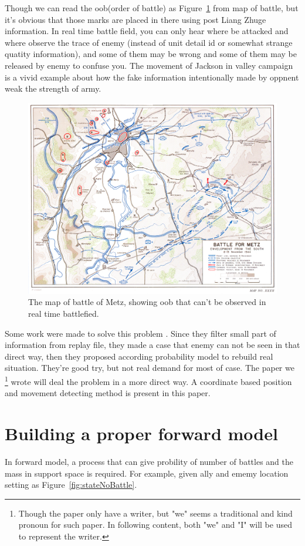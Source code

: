\documentclass{article}
\begin{document}
Though we can read the oob(order of battle) as Figure~\ref{fig:metz} from map of battle, but it's obvious that those marks are 
placed in there using post Liang Zhuge information. In real time battle field, you can only hear where
be attacked and where observe the trace of enemy (instead of unit detail id or somewhat strange quatity
information), and some of them may be wrong and some of them may be released by enemy to confuse you.
The movement of Jackson in valley campaign is a vivid example about how the fake information intentionally
made by oppnent weak the strength of army.

\begin{figure}[h]
\includegraphics[width=0.6\linewidth]{metz.jpg}
\caption{The map of battle of Metz, showing oob that can't be observed in real time battlefied. }
\label{fig:metz}
\end{figure}


Some work were made to solve this problem 
\cite{hostetler2012inferring} \cite{vsmejkal2016integrating} \cite{touhou}.
Since they filter small part of information from replay file, they made a case that enemy can not be 
seen in that direct way, then they proposed according probability model to rebuild real situation.
They're good try, but not real demand for most of case. The paper we
\footnote{Though the paper only have a writer, 
but "we" seems a traditional and kind pronoun for such paper. 
In following content, both "we" and "I" will be used to represent the writer.} 
wrote will deal the problem in a more direct way. 
A coordinate based position and movement detecting method is present in this paper.

\section{Building a proper forward model}


In forward model, a process that can give probility of number of battles and the mass in support space 
is required. For example, given ally and ememy location setting as Figure~\ref{fig:stateNoBattle}.
\end{document}
